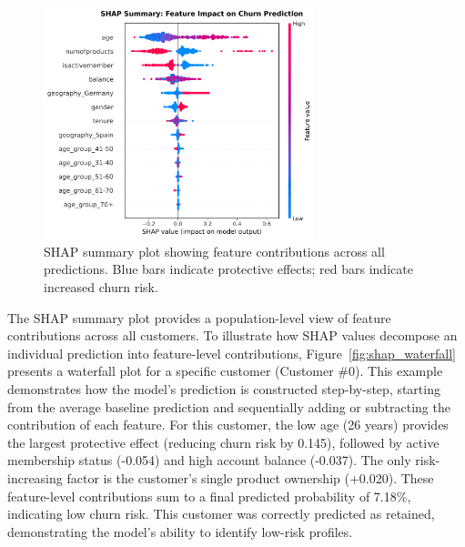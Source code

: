 \documentclass[12pt]{article}
\begin{document}
\begin{figure}[H]
\centering
\includegraphics[width=0.7\textwidth]{img/20_shap_summary.png}
\caption{SHAP summary plot showing feature contributions across all predictions. Blue bars indicate protective effects; red bars indicate increased churn risk.}
\label{fig:shap}
\end{figure}

The SHAP summary plot provides a population-level view of feature contributions across all customers. To illustrate how SHAP values decompose an individual prediction into feature-level contributions, Figure~\ref{fig:shap_waterfall} presents a waterfall plot for a specific customer (Customer \#0). This example demonstrates how the model's prediction is constructed step-by-step, starting from the average baseline prediction and sequentially adding or subtracting the contribution of each feature. For this customer, the low age (26 years) provides the largest protective effect (reducing churn risk by 0.145), followed by active membership status (-0.054) and high account balance (-0.037). The only risk-increasing factor is the customer's single product ownership (+0.020). These feature-level contributions sum to a final predicted probability of 7.18\%, indicating low churn risk. This customer was correctly predicted as retained, demonstrating the model's ability to identify low-risk profiles.
\end{document}

